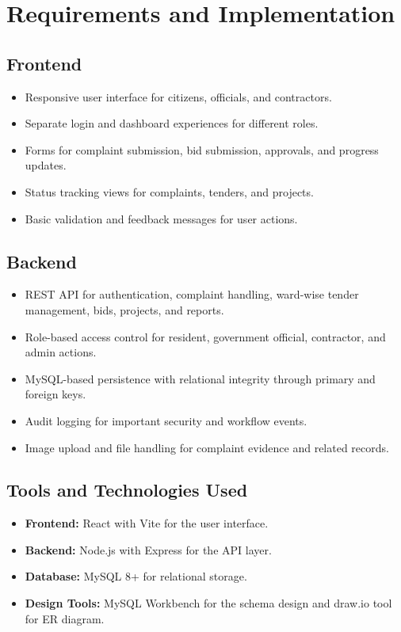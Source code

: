 \documentclass[12pt,a4paper,oneside,openany]{report}
\begin{document}
\chapter*{Requirements and Implementation}
{}


\section*{Frontend}
\begin{itemize}[leftmargin=*]
  \item Responsive user interface for citizens, officials, and contractors.
  \item Separate login and dashboard experiences for different roles.
  \item Forms for complaint submission, bid submission, approvals, and progress updates.
  \item Status tracking views for complaints, tenders, and projects.
  \item Basic validation and feedback messages for user actions.
\end{itemize}

\section*{Backend}
\begin{itemize}[leftmargin=*]
  \item REST API for authentication, complaint handling, ward-wise tender management, bids, projects, and reports.
  \item Role-based access control for resident, government official, contractor, and admin actions.
  \item MySQL-based persistence with relational integrity through primary and foreign keys.
  \item Audit logging for important security and workflow events.
  \item Image upload and file handling for complaint evidence and related records.
\end{itemize}



\section*{Tools and Technologies Used}
\begin{itemize}[leftmargin=*]
  \item \textbf{Frontend:} React with Vite for the user interface.
  \item \textbf{Backend:} Node.js with Express for the API layer.
  \item \textbf{Database:} MySQL 8+ for relational storage.
  \item \textbf{Design Tools:} MySQL Workbench for the schema design and draw.io tool for ER diagram.

\end{itemize}
\end{document}
